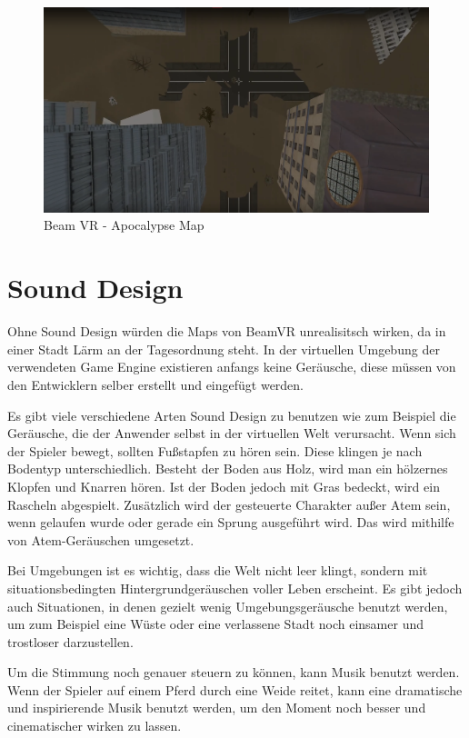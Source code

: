\begin {figure}
    \centering
    \includegraphics[scale=0.3]{pics/beamvr_apocalypse-overview}
    \caption{Beam VR - Apocalypse Map}
    \label{fig:beamvr_apocalypse_map}
\end {figure}

\section{Sound Design}\label{sec:sound}
Ohne Sound Design würden die Maps von BeamVR unrealisitsch wirken, da in einer Stadt Lärm an der Tagesordnung steht.
In der virtuellen Umgebung der verwendeten Game Engine existieren anfangs keine Geräusche, diese m\"ussen von den Entwicklern selber erstellt und eingef\"ugt werden.


Es gibt viele verschiedene Arten Sound Design zu benutzen wie zum Beispiel die Ger\"ausche, die der Anwender selbst in der virtuellen Welt verursacht.
Wenn sich der Spieler bewegt, sollten Fußstapfen zu h\"oren sein.
Diese klingen je nach Bodentyp unterschiedlich.
Besteht der Boden aus Holz, wird man ein h\"olzernes Klopfen und Knarren h\"oren.
Ist der Boden jedoch mit Gras bedeckt, wird ein Rascheln abgespielt.
Zus\"atzlich wird der gesteuerte Charakter außer Atem sein, wenn gelaufen wurde oder gerade ein Sprung ausgef\"uhrt wird.
Das wird mithilfe von Atem-Geräuschen umgesetzt.

Bei Umgebungen ist es wichtig, dass die Welt nicht leer klingt, sondern mit situationsbedingten Hintergrundger\"auschen voller Leben erscheint.
Es gibt jedoch auch Situationen, in denen gezielt wenig Umgebungsger\"ausche benutzt werden, um zum Beispiel eine W\"uste oder eine verlassene Stadt noch einsamer und trostloser darzustellen.

Um die Stimmung noch genauer steuern zu k\"onnen, kann Musik benutzt werden.
Wenn der Spieler auf einem Pferd durch eine Weide reitet, kann eine dramatische und inspirierende Musik benutzt werden, um den Moment noch besser und cinematischer wirken zu lassen.

